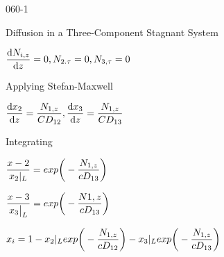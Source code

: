 \begin{mitframe}{060-1}
\begin{listone}
\begin{listtwo}
        \end{listtwo}
\item Diffusion in a Three-Component Stagnant System
		\begin{listtwo}
        	\item $\dfrac{\mathrm{d}\nummoles_{\state, z}}{\mathrm{d}z}=0, \nummoles_{2.\torque}=0,\nummoles_{3,\torque}=0$
            \item Applying Stefan-Maxwell
            	\begin{listthree}
                \item $\dfrac{\mathrm{d}\disp_2}{\mathrm{d}z}=\dfrac{\nummoles_{1,z}}{\conc\elecdisplace_{12}},\dfrac{\mathrm{d}\disp_3}{\mathrm{d}z}=\dfrac{\nummoles_{1,z}}{\conc\elecdisplace_{13}}$
                
                \item Integrating
                	\begin{listfour}
                    	\item $\dfrac{\disp-2}{\disp_2|_{\length}}=exp\bigg(-\dfrac{\nummoles_{1,z}}{c\elecdisplace_{13}}\bigg)$
                        \item $\dfrac{\disp-3}{\disp_3\big|_{\length}}=exp\bigg(-\dfrac{\nummoles{1,z}}{c\elecdisplace_{13}}\bigg)$
                    \end{listfour}
                \end{listthree}
        	\item $\specfrac{i}=1-\disp_2|_{\length}exp\bigg(-\dfrac{\nummoles_{1,z}}{c\elecdisplace_{12}}\bigg)-\disp_3|_{\length}exp\bigg(-\dfrac{\nummoles_{1,z}}{c\elecdisplace_{13}}\bigg)$
            
        \end{listtwo}
\end{listone}    
\end{mitframe}